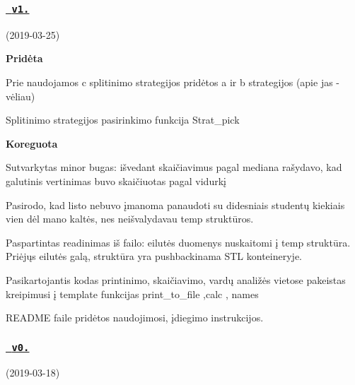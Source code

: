  \subsubsection*{\href{https://github.com/gitguuddd/Obj_Duomenu_apdorojimas/releases/tag/v1.0}{\texttt{ v1.}}}

(2019-\/03-\/25)

{\bfseries{Pridėta}}
\begin{DoxyItemize}
\item Prie naudojamos {\ttfamily c} splitinimo strategijos pridėtos {\ttfamily a} ir {\ttfamily b} strategijos (apie jas -\/ vėliau)
\item Splitinimo strategijos pasirinkimo funkcija {\ttfamily Strat\+\_\+pick}
\end{DoxyItemize}

{\bfseries{Koreguota}}
\begin{DoxyItemize}
\item Sutvarkytas minor bug\textquotesingle{}as\+: išvedant skaičiavimus pagal mediana rašydavo, kad galutinis vertinimas buvo skaičiuotas pagal vidurkį
\item Pasirodo, kad listo nebuvo įmanoma panaudoti su didesniais studentų kiekiais vien dėl mano kaltės, nes neišvalydavau temp struktūros.
\item Paspartintas readinimas iš failo\+: eilutės duomenys nuskaitomi į temp struktūra. Priėjųs eilutės galą, struktūra yra pushbackinama S\+TL konteineryje.
\item Pasikartojantis kodas printinimo, skaičiavimo, vardų analižės vietose pakeistas kreipimusi į template funkcijas {\ttfamily print\+\_\+to\+\_\+file ,calc , names}
\item R\+E\+A\+D\+ME fail\textquotesingle{}e pridėtos naudojimosi, įdiegimo instrukcijos.
\end{DoxyItemize}



 \subsubsection*{\href{https://github.com/gitguuddd/Obj_Duomenu_apdorojimas/releases/tag/v0.5}{\texttt{ v0.}}}

(2019-\/03-\/18)  


